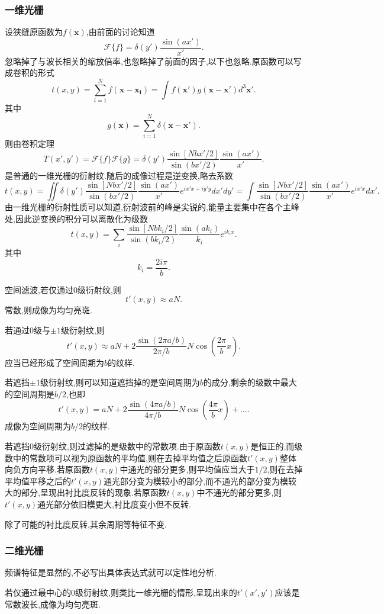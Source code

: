 \documentclass[10pt]{ctexart}
\begin{document}
\subsubsection{一维光栅}
设狭缝原函数为$f(\bm{x})$,由前面的讨论知道
$$\mathcal{F}\{f\}=\delta(y')\frac{\sin{(ax')}}{x'}.$$
忽略掉了与波长相关的缩放倍率,也忽略掉了前面的因子,以下也忽略.原函数可以写成卷积的形式
$$t(x,y)=\displaystyle\sum_{i=1}^{N}f(\bm{x}-\bm{x_i})=\int f(\bm{x'})g(\bm{x}-\bm{x'})d^3\bm{x'}.$$
其中
$$g(\bm{x})=\displaystyle\sum_{i=1}^{N}\delta(\bm{x}-\bm{x'}).$$
则由卷积定理
$$T(x',y')=\mathcal{F}\{f\}\mathcal{F}\{g\}=\delta(y')\frac{\sin{[Nbx'/2]}}{\sin{(bx'/2)}}\frac{\sin{(ax')}}{x'}.$$
是普通的一维光栅的衍射纹.随后的成像过程是逆变换,略去系数
$$t(x,y)=\iint \delta(y')\frac{\sin{[Nbx'/2]}}{\sin{(bx'/2)}}\frac{\sin{(ax')}}{x'}e^{ix'x+iy'y}dx'dy'=\int \frac{\sin{[Nbx'/2]}}{\sin{(bx'/2)}}\frac{\sin{(ax')}}{x'}e^{ix'x}dx'.$$
由一维光栅的衍射性质可以知道,衍射波前的峰是尖锐的,能量主要集中在各个主峰处,因此逆变换的积分可以离散化为级数
$$t(x,y)=\displaystyle\sum_{i}\frac{\sin{[Nbk_i/2]}}{\sin{(bk_i/2)}}\frac{\sin{(ak_i)}}{k_i}e^{ik_ix}.$$
其中
$$k_i=\frac{2i\pi}{b}.$$

空间滤波,若仅通过0级衍射纹,则
$$t'(x,y)\approx aN.$$
常数,则成像为均匀亮斑.

若通过0级与$\pm 1$级衍射纹,则
$$t'(x,y)\approx aN+2\frac{\sin{(2\pi a/b)}}{2\pi/b}N\cos{(\frac{2\pi}{b}x)}.$$
应当已经形成了空间周期为$b$的纹样.

若遮挡$\pm 1$级衍射纹,则可以知道遮挡掉的是空间周期为$b$的成分,剩余的级数中最大的空间周期是$b/2$,也即
$$t'(x,y)=aN+2\frac{\sin{(4\pi a/b)}}{4\pi/b}N\cos{(\frac{4\pi}{b}x)}+....$$
成像为空间周期为$b/2$的纹样.

若遮挡$0$级衍射纹,则过滤掉的是级数中的常数项.由于原函数$t(x,y)$是恒正的,而级数中的常数项可以视为原函数的平均值,则在去掉平均值之后原函数$t'(x,y)$整体向负方向平移.若原函数$t(x,y)$中通光的部分更多,则平均值应当大于$1/2$,则在去掉平均值平移之后的$t'(x,y)$通光部分变为模较小的部分,而不通光的部分变为模较大的部分,呈现出衬比度反转的现象.若原函数$t(x,y)$中不通光的部分更多,则$t'(x,y)$通光部分依旧模更大,衬比度变小但不反转.

除了可能的衬比度反转,其余周期等特征不变.
\subsubsection{二维光栅}
频谱特征是显然的,不必写出具体表达式就可以定性地分析.

若仅通过最中心的$0$级衍射纹,则类比一维光栅的情形,呈现出来的$t'(x',y')$应该是常数波长,成像为均匀亮斑.
\end{document}
